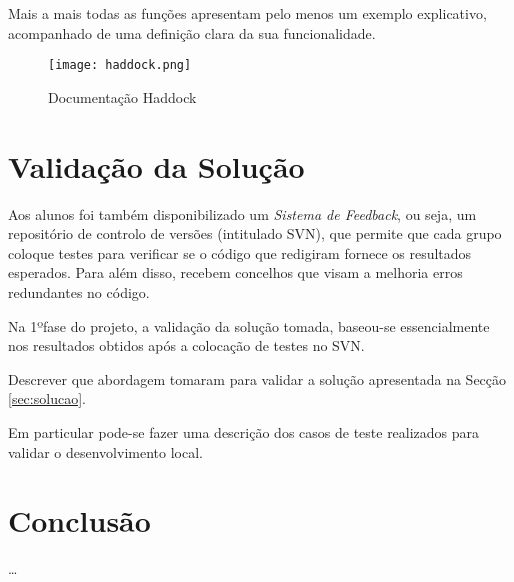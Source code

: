 \documentclass[a4paper]{report} %
\begin{document}
Mais a mais todas as funções apresentam pelo menos um exemplo explicativo, acompanhado de uma definição clara da sua funcionalidade. 





\begin{figure}[h!]
    \centering
    \texttt{[image: haddock.png]}
    \caption{Documentação Haddock}
    \label{fig:my_label}
\end{figure}


\chapter{Validação da Solução}

Aos alunos foi também disponibilizado um \emph{Sistema de Feedback}, ou seja, um repositório de controlo de versões (intitulado SVN), que permite que cada grupo coloque testes para verificar se o código que redigiram fornece os resultados esperados. Para além disso, recebem concelhos que visam a melhoria erros redundantes no código.

Na 1ºfase do projeto, a validação da solução tomada, baseou-se essencialmente nos resultados obtidos após a colocação de testes no SVN.

Descrever que abordagem tomaram para validar a solução apresentada na Secção \ref{sec:solucao}.

Em particular pode-se fazer uma descrição dos casos de teste
realizados para validar o desenvolvimento local.


\chapter{Conclusão}

\ldots



\end{document}
